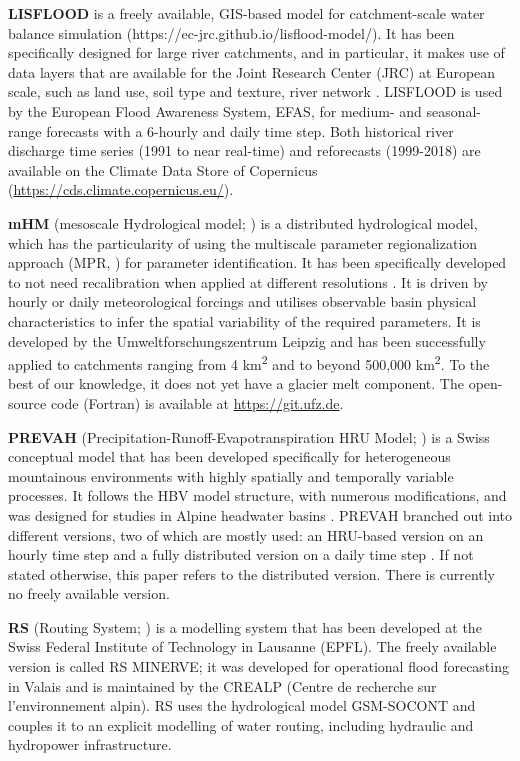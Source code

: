 \documentclass[10pt,a4paper]{article}
\begin{document}
\textbf{LISFLOOD} is a freely available, GIS-based model for catchment-scale water balance simulation \citep{vanDerKniff2010} (https://ec-jrc.github.io/lisflood-model/). It has been specifically designed for large river catchments, and in particular, it makes use of data layers that are available for the Joint Research Center (JRC) at European scale, such as land use, soil type and texture, river network \citep{Thielen2009}. LISFLOOD is used by the European Flood Awareness System, EFAS, for medium- and seasonal-range forecasts with a 6-hourly and daily time step. Both historical river discharge time series (1991 to near real-time) and reforecasts (1999-2018) are available on the Climate Data Store of Copernicus (\url{https://cds.climate.copernicus.eu/}). 

\textbf{mHM} (mesoscale Hydrological model; \citealt{Samaniego2010a, Kumar2013, Thober2019}) is a distributed hydrological model, which has the particularity of using the multiscale parameter regionalization approach (MPR, \citealp{Samaniego2010a}) for parameter identification. It has been specifically developed to not need recalibration when applied at different resolutions \citep{Kauffeldt2016}. It is driven by hourly or daily meteorological forcings and utilises observable basin physical characteristics to infer the spatial variability of the required parameters. It is developed by the Umweltforschungszentrum Leipzig and has been successfully applied to catchments ranging from 4 km\textsuperscript{2} and to beyond 500,000 km\textsuperscript{2}. To the best of our knowledge, it does not yet have a glacier melt component. The open-source code (Fortran) is available at \url{https://git.ufz.de}.

\textbf{PREVAH} (Precipitation-Runoff-Evapotranspiration HRU Model; \citealt{Gurtz1999, Viviroli2009a}) is a Swiss conceptual model that has been developed specifically for heterogeneous mountainous environments with highly spatially and temporally variable processes. It follows the HBV model structure, with numerous modifications, and was designed for studies in Alpine headwater basins \citep{Orth2015}. PREVAH branched out into different versions, two of which are mostly used: an HRU-based version on an hourly time step \citep{Viviroli2009a} and a fully distributed version on a daily time step \citep{Zappa2012, Speich2015}. If not stated otherwise, this paper refers to the distributed version. There is currently no freely available version.

\textbf{RS} (Routing System; \citealp{Dubois2000, GarciaHernandez2020, Foehn2020}) is a modelling system that has been developed at the Swiss Federal Institute of Technology in Lausanne (EPFL). The freely available version is called RS MINERVE; it was developed for operational flood forecasting in Valais \citep{GarciaHernandez2009b,Hamdi2005} and is maintained by the CREALP (Centre de recherche sur l'environnement alpin). RS uses the hydrological model GSM-SOCONT and couples it to an explicit modelling of water routing, including hydraulic and hydropower infrastructure.
\end{document}
